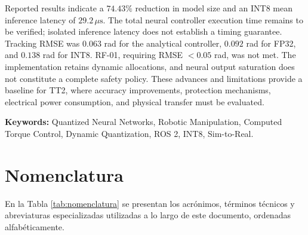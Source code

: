 \documentclass[12pt]{article}
\begin{document}
Reported results indicate a $74.43\%$ reduction in model size and an INT8 mean inference latency of $29.2\,\mu\text{s}$. The total neural controller execution time remains to be verified; isolated inference latency does not establish a timing guarantee. Tracking RMSE was $0.063$ rad for the analytical controller, $0.092$ rad for FP32, and $0.138$ rad for INT8. RF-01, requiring RMSE $<0.05$ rad, was not met. The implementation retains dynamic allocations, and neural output saturation does not constitute a complete safety policy. These advances and limitations provide a baseline for TT2, where accuracy improvements, protection mechanisms, electrical power consumption, and physical transfer must be evaluated.

\vspace{0.6cm}
\textbf{Keywords:} Quantized Neural Networks, Robotic Manipulation, Computed Torque Control, Dynamic Quantization, ROS 2, INT8, Sim-to-Real.

\newpage
{}
\listoffigures

\newpage
{}
\listoftables

\newpage
\section*{Nomenclatura}

En la Tabla \ref{tab:nomenclatura} se presentan los acrónimos, términos técnicos y abreviaturas especializadas utilizadas a lo largo de este documento, ordenadas alfabéticamente.
\end{document}
